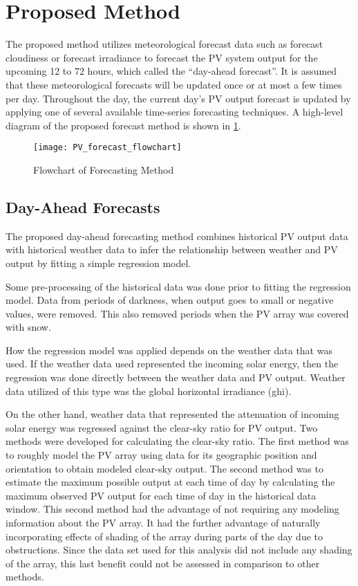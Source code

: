\section{Proposed Method}
\label{sec:proposed-method}

The proposed method utilizes meteorological forecast data such as forecast cloudiness or forecast irradiance to forecast the PV system output for the upcoming 12 to 72 hours, which called the ``day-ahead forecast''.
It is assumed that these meteorological forecasts will be updated once or at most a few times per day.
Throughout the day, the current day's PV output forecast is updated by applying one of several available time-series forecasting techniques.
A high-level diagram of the proposed forecast method is shown in \cref{fig:PV_forecast_flowchart}.

\begin{figure}[t]
	\centering
	\texttt{[image: PV\_forecast\_flowchart]}
	\caption{Flowchart of Forecasting Method}
	\label{fig:PV_forecast_flowchart}
\end{figure}


\subsection{Day-Ahead Forecasts}

The proposed day-ahead forecasting method combines historical PV output data with historical weather data to infer the relationship between weather and PV output by fitting a simple regression model.

Some pre-processing of the historical data was done prior to  fitting the regression model.
Data from periods of darkness, when output goes to small or negative values, were removed.
This also removed periods when the PV array was covered with snow.

How the regression model was applied depends on the weather data that was used.
If the weather data used represented the incoming solar energy, then the regression was done directly between the weather data and PV output.
Weather data utilized of this type was the global horizontal irradiance (ghi).

On the other hand, weather data that represented the attenuation of incoming solar energy was regressed against the clear-sky ratio for PV output.
Two methods were developed for calculating the clear-sky ratio.
The first method was to roughly model the PV array using data for its geographic position and orientation to obtain modeled clear-sky output.
The second method was to estimate the maximum possible output at each time of day by calculating the maximum observed PV output for each time of day in the historical data window.
This second method had the advantage of not requiring any modeling information about the PV array.
It had the further advantage of naturally incorporating effects of shading of the array during parts of the day due to obstructions.
Since the data set used for this analysis did not include any shading of the array, this last benefit could not be assessed in comparison to other methods.

